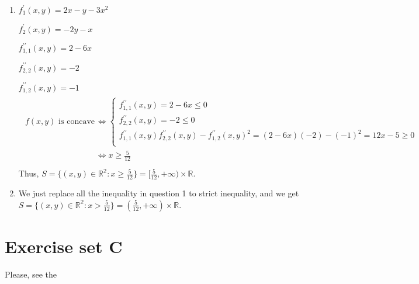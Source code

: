 \documentclass[letterpaper,10pt,english]{jupyterBook}
\begin{document}
\sphinxAtStartPar
{}
\begin{enumerate}
%
\item {} 
\sphinxAtStartPar
\(f^{\prime}_{1}(x, y) = 2x - y -3x^2\)

\sphinxAtStartPar
\(f^{\prime}_{2}(x, y) = -2y - x\)

\sphinxAtStartPar
\(f^{\prime\prime}_{1, 1}(x, y) = 2 - 6x\)

\sphinxAtStartPar
\(f^{\prime\prime}_{2, 2}(x, y) = -2\)

\sphinxAtStartPar
\(f^{\prime\prime}_{1, 2}(x, y) = -1\)
\begin{equation*}
\begin{split}
   \begin{aligned}
   f(x, y) \text{ is concave } &\iff
   \begin{cases}
    f^{\prime\prime}_{1, 1}(x, y) = 2 - 6x \leq 0 \\
    f^{\prime\prime}_{2, 2}(x, y) = -2 \leq 0 \\
    f^{\prime\prime}_{1, 1}(x, y) f^{\prime\prime}_{2, 2}(x, y) - f^{\prime\prime}_{1, 2}(x, y)^2 = (2 - 6x)(-2) - (-1)^2 = 12x - 5 \geq 0 \\
   \end{cases} \\
   &\iff x \geq \frac{5}{12}\\
   \end{aligned}
   \end{split}
\end{equation*}
\sphinxAtStartPar
Thus, \(S = \{(x, y) \in \mathbb{R^2}: x \geq \frac{5}{12}\}= [\frac{5}{12}, +\infty) \times \mathbb{R}\).

\item {} 
\sphinxAtStartPar
We just replace all the inequality in question 1 to strict inequality, and we get \(S = \{(x, y) \in \mathbb{R^2}: x > \frac{5}{12}\}= (\frac{5}{12}, +\infty) \times \mathbb{R}\).

\end{enumerate}

\sphinxstepscope


\chapter{Exercise set C}
\label{\detokenize{04.exercises:exercise-set-c}}\label{\detokenize{04.exercises::doc}}
\sphinxAtStartPar
Please, see the
{\hyperref[\detokenize{02.exercises::doc}]{}}
\end{document}
